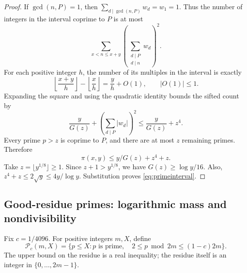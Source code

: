 \documentclass[12pt,leqno]{article}
\numberwithin{equation}{section}
\theoremstyle{remark}
\begin{document}
\begin{proof}
If $\gcd(n,P)=1$, then $\sum_{d\mid\gcd(n,P)}w_d=w_1=1$. Thus the number of integers in the interval coprime to $P$ is at most
\[
\sum_{x<n\le x+y}\left(\sum_{\substack{d\mid P\\d\mid n}}w_d\right)^2.
\]
For each positive integer $h$, the number of its multiples in the interval is exactly
\[
\left\lfloor\frac{x+y}{h}\right\rfloor-\left\lfloor\frac{x}{h}\right\rfloor
=\frac yh+O(1),\qquad |O(1)|\le1.
\]
Expanding the square and using the quadratic identity bounds the sifted count by
\[
\frac y{G(z)}+\left(\sum_{d\mid P}|w_d|\right)^2\le\frac y{G(z)}+z^4.
\]
Every prime $p>z$ is coprime to $P$, and there are at most $z$ remaining primes. Therefore
\begin{equation}\label{eq:finitesieve}
\pi(x,y)\le y/G(z)+z^4+z.
\end{equation}
Take $z=\lfloor y^{1/8}\rfloor\ge1$. Since $z+1>y^{1/8}$, we have $G(z)\ge\log y/16$. Also, $z^4+z\le2\sqrt y\le4y/\log y$. Substitution proves \eqref{eq:primeinterval}.
\end{proof}

\subsection{Good-residue primes: logarithmic mass and nondivisibility}
Fix $c=1/4096$. For positive integers $m,X$, define
\[
\mathcal P_c(m,X)=\{p\le X:p\text{ is prime},\quad
2\le p\bmod 2m\le(1-c)2m\}.
\]
The upper bound on the residue is a real inequality; the residue itself is an integer in $\{0,\ldots,2m-1\}$.
\end{document}
